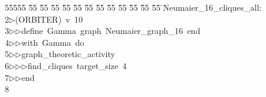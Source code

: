 %
%
\begin{tabbing}
55555 \= 55 \= 55 \= 55 \= 55 \= 55 \= 55 \= 55 \= 55 \= 55 \= 55 \= 55 \= 55 \= \>Neumaier\_16\_cliques\_all:\\[0pt]
2\>$\triangleright$\>(ORBITER)\ v\ 10\ \\[0pt]
3\>$\triangleright$\>$\triangleright$\>define\ Gamma\ graph\ Neumaier\_graph\_16\ end\ \\[0pt]
4\>$\triangleright$\>$\triangleright$\>with\ Gamma\ do\ \\[0pt]
5\>$\triangleright$\>$\triangleright$\>graph\_theoretic\_activity\ \\[0pt]
6\>$\triangleright$\>$\triangleright$\>$\triangleright$\>find\_cliques\ target\_size\ 4\ \\[0pt]
7\>$\triangleright$\>$\triangleright$\>end\\[0pt]
8\>\end{tabbing}
